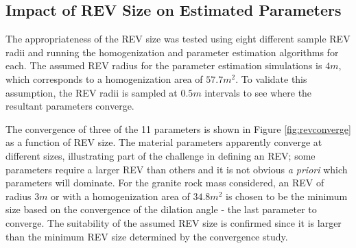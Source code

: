 \subsection{Impact of REV Size on Estimated Parameters}

The appropriateness of the REV size was tested using eight different sample REV radii and running the homogenization and parameter estimation algorithms for each. The assumed REV radius for the parameter estimation simulations is $4m$, which corresponds to a homogenization area of $57.7 m^2$. To validate this assumption, the REV radii is sampled at $0.5m$ intervals to see where the resultant parameters converge.

The convergence of three of the 11 parameters is shown in Figure \ref{fig:revconverge} as a function of REV size. The material parameters apparently converge at different sizes, illustrating part of the challenge in defining an REV; some parameters require a larger REV than others and it is not obvious \textit{a priori} which parameters will dominate. For the granite rock mass considered, an REV of radius $3m$ or with a homogenization area of $34.8 m^2$ is chosen to be the minimum size based on the convergence of the dilation angle - the last parameter to converge. The suitability of the assumed REV size is confirmed since it is larger than the minimum REV size determined by the convergence study.